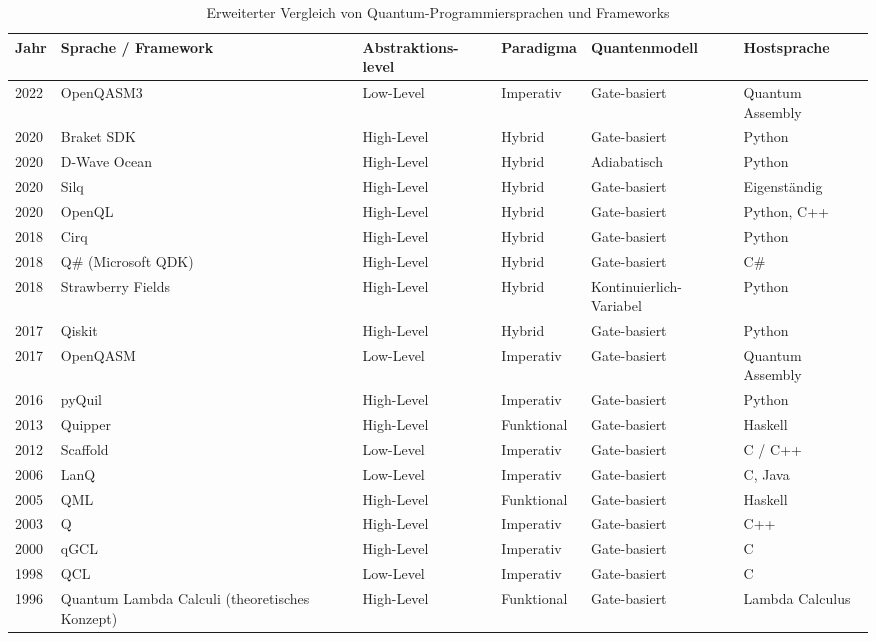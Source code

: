 \begin{table}[ht!]
\centering
\footnotesize
\begin{tabular}{|p{1cm}|p{2cm}|p{2cm}|p{1.5cm}|p{2cm}|p{1.5cm}|}
\hline
\textbf{Jahr} & 
\textbf{Sprache / Framework} & 
\textbf{Abstraktions-level} & 
\textbf{Paradigma} & 
\textbf{Quantenmodell} & 
\textbf{Hostsprache} \\
\hline
2022 & OpenQASM3 & Low-Level & Imperativ & Gate-basiert & Quantum Assembly \\
\hline
2020 & Braket SDK & High-Level & Hybrid & Gate-basiert & Python \\
\hline
2020 & D-Wave Ocean & High-Level & Hybrid & Adiabatisch & Python \\
\hline
2020 & Silq & High-Level & Hybrid & Gate-basiert & Eigenständig \\
\hline
2020 & OpenQL & High-Level & Hybrid & Gate-basiert & Python, C++ \\
\hline
2018 & Cirq & High-Level & Hybrid & Gate-basiert & Python \\
\hline
2018 & Q\# (Microsoft QDK) & High-Level & Hybrid & Gate-basiert & C\# \\
\hline
2018 & Strawberry Fields & High-Level & Hybrid & Kontinuierlich-Variabel & Python \\
\hline
2017 & Qiskit & High-Level & Hybrid & Gate-basiert & Python \\
\hline
2017 & OpenQASM & Low-Level & Imperativ &  Gate-basiert & Quantum Assembly \\
\hline
2016 & pyQuil & High-Level & Imperativ &  Gate-basiert & Python \\
\hline
2013 & Quipper & High-Level & Funktional & Gate-basiert & Haskell \\
\hline
2012 & Scaffold & Low-Level & Imperativ &  Gate-basiert & C / C++ \\
\hline
2006 & LanQ & Low-Level & Imperativ & Gate-basiert & C, Java \\
\hline
2005 & QML & High-Level & Funktional & Gate-basiert & Haskell \\
\hline
2003 & Q & High-Level & Imperativ & Gate-basiert & C++ \\
\hline
2000 & qGCL & High-Level & Imperativ &  Gate-basiert & C \\
\hline
1998 & QCL & Low-Level & Imperativ & Gate-basiert & C \\
\hline
1996 & Quantum Lambda Calculi (theoretisches Konzept) & High-Level & Funktional & Gate-basiert & Lambda Calculus \\

\hline
\end{tabular}
\caption{Erweiterter Vergleich von Quantum-Programmiersprachen und Frameworks}
\label{tab:quantum_languages_full}
\end{table}


